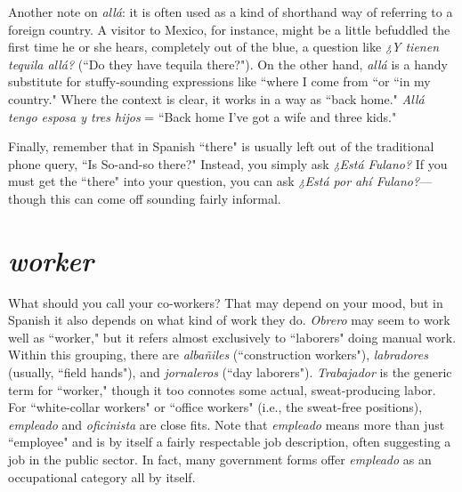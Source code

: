 Another note on \emph{allá}: it is often used as a kind of shorthand
way of referring to a foreign country. A visitor to Mexico, for instance,
might be a little befuddled the first time he or she hears, completely
out of the blue, a question like \emph{¿Y tienen tequila allá?} (``Do they have
tequila there?"). On the other hand, \emph{allá} is a handy substitute for
stuffy-sounding expressions like ``where I come from ``or ``in my country." Where the context is clear, it works in a way as ``back home."
\emph{Allá tengo esposa y tres hijos} = ``Back home I've got a wife and
three kids."

Finally, remember that in Spanish ``there" is usually left out of
the traditional phone query, ``Is So-and-so there?" Instead, you simply
ask \emph{¿Está Fulano?} If you must get the ``there" into your question, you
can ask \emph{¿Está por ahí Fulano?}---though this can come off sounding
fairly informal.

\section{\emph{worker}}

What should you call your co-workers? That may depend on
your mood, but in Spanish it also depends on what kind of work they
do. \emph{Obrero} may seem to work well as ``worker," but it refers almost
exclusively to ``laborers" doing manual work. Within this grouping,
there are \emph{albañiles} (``construction workers"), \emph{labradores} (usually,
``field hands"), and \emph{jornaleros} (``day laborers"). \emph{Trabajador} is the generic term for ``worker," though it too connotes some actual, sweat-producing labor. For ``white-collar workers" or ``office workers" (i.e.,
the sweat-free positions), \emph{empleado} and \emph{oficinista} are close fits. Note
that \emph{empleado} means more than just ``employee" and is by itself a
fairly respectable job description, often suggesting a job in the public
sector. In fact, many government forms offer \emph{empleado} as an occupational category all by itself.

